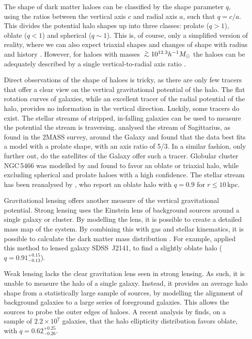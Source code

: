 \documentclass[useAMS,usenatbib]{mn2e}
\newcommand{\simgt}{\lower.5ex\hbox{$\; \buildrel > \over \sim \;$}}
\begin{document}
The shape of dark matter haloes can be classified by the shape 
parameter $q$, using the ratios between the vertical axis $c$ 
and radial axis $a$, such that $q = c/a$.
This divides the potential halo shapes up into three classes: 
prolate ($q > 1$), oblate ($q < 1$) and spherical ($q \sim 1$). 
This is, of course, only a simplified version of reality, where 
we can also expect triaxial shapes and changes of shape with radius 
and history \citep{VeraCiro2014}.
However, for haloes with masses $\simgt 10^{12.3} h^{-1} M_\odot$ the 
haloes can be adequately described by a single vertical-to-radial 
axis ratio \citep{Schneider2012A}.

Direct observations of the shape of haloes is tricky, as there are 
only few tracers that offer a clear view on the vertical gravitational 
potential of the halo.
The flat rotation curves of galaxies, while an excellent tracer of the 
radial potential of the halo, provides no information in the vertical direction.
Luckily, some tracers do exist.
The stellar streams of stripped, in-falling galaxies can be used to 
measure the potential the stream is traversing.
\citet{Helmi2004A} analysed the stream of Sagittarius, as found in the 
2MASS survey, around the Galaxy and found that the data best fits a model 
with a prolate shape, with an axis ratio of 5/3.
In a similar fashion, only further out, do the satellites of the Galaxy 
offer such a tracer.
Globular cluster NGC\,5466 was modelled by \citet{Lux2012A} and found 
to favor an oblate or triaxial halo, while excluding spherical and prolate 
haloes with a high confidence.
The stellar stream has been reanalysed by \citet{VeraCiro2013}, who report 
an oblate halo with $q=0.9$ for $r\leq10$\,kpc.
 
Gravitational lensing offers another measure of the vertical gravitational 
potential. 
Strong lensing uses the Einstein lens of background sources around a single 
galaxy or cluster.
By modelling the lens, it is possible to create a detailed mass map of the 
system.
By combining this with gas and stellar kinematics, it is possible to 
calculate the dark matter mass distribution \citep{Treu2010A}.
For example, \citet{Barnabe2012A} applied this method to lensed galaxy 
SDSS\, J2141, to find a slightly oblate halo ($q = 0.91^{+0.15}_{-0.13}$).

Weak lensing lacks the clear gravitation lens seen in strong lensing. 
As such, it is unable to measure the halo of a single galaxy.
Instead, it provides an average halo shape from a statistically large 
sample of sources, by modelling the alignment of background galaxies 
to a large series of foreground galaxies.
This allows the sources to probe the outer edges of haloes.
A recent analysis by \citet{vanUitert2012} finds, on a sample of 
$2.2\times10^7$ galaxies, that the halo ellipticity distribution 
favors oblate, with $q=0.62^{+0.25}_{-0.26}$.
\end{document}
